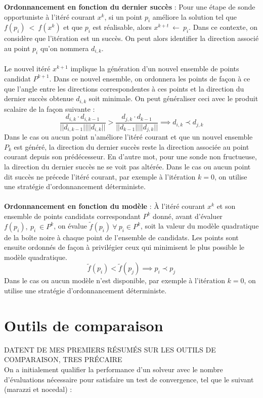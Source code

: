 \documentclass[letterpaper]{scrartcl}
\begin{document}
\indent \textbf{Ordonnancement en fonction du dernier succès} : Pour une étape de sonde opportuniste à l'itéré courant $x^k$, si un point $p_i$ améliore la solution tel que $f(p_i)\ <\ f(x^k)$ et que $p_i$ est réalisable, alors $x^{k+t}\ \leftarrow \ p_i$. Dans ce contexte, on considère que l'itération est un succès. On peut alors identifier la direction associé au point $p_i$ qu'on nommera $d_{i,k}$. \\\\
\indent Le nouvel itéré $x^{k+1}$ implique la génération d'un nouvel ensemble de points candidat $P^{k+1}$. Dans ce nouvel ensemble, on ordonnera les points de façon à ce que l'angle entre les directions correspondentes à ces points et la direction du dernier succès obtenue $d_{i,k}$ soit minimale. On peut généraliser ceci avec le produit scalaire de la façon suivante : 
\begin{equation}
\frac{d_{i,k}\cdot d_{i,k-1}}{||d_{i,k-1}||||{d_{i,k}||}} > \frac{d_{j,k}\cdot d_{k-1}}{||d_{k-1}||||{d_{j,k}||}}  \implies d_{i,k} \prec d_{j,k}  
\end{equation}
Dans le cas ou aucun point n'améliore l'itéré courant et que un nouvel ensemble $P_k$ est généré, la direction du dernier succès reste la direction associée au point courant depuis son prédécesseur. En d'autre mot, pour une sonde non fructueuse, la direction du dernier succès ne se voit pas altérée. Dans le cas ou aucun point dit succès ne précede l'itéré courant, par exemple à l'itération $k=0$, on utilise une stratégie d'ordonnancement déterministe.
\\\\
\textbf{Ordonnancement en fonction du modèle} : À l'itéré courant $x^k$ et son ensemble de points candidats correspondant $P^k$ donné, avant d'évaluer $f(p_i), \ p_i \ \in P^k$, on évalue $\tilde{f}(p_i) \ \forall \ p_i \in P^k$, soit la valeur du modèle quadratique de la boîte noire à chaque point de l'ensemble de candidats. Les points sont ensuite ordonnés de façon à privilégier ceux qui minimisent le plus possible le modèle quadratique. 
\begin{equation}
\tilde{f}(p_i) < \tilde{f}(p_j) \implies p_i \prec p_j
\end{equation}
Dans le cas ou aucun modèle n'est disponible, par exemple à l'itération $k=0$, on utilise une stratégie d'ordonnancement déterministe.
\section{Outils de comparaison}
DATENT DE MES PREMIERS RÉSUMÉS SUR LES OUTILS DE COMPARAISON, TRES PRÉCAIRE\\
On a initialement qualifier la performance d'un solveur avec le nombre d'évaluations nécessaire pour satisfaire un test de convergence, tel que le suivant (marazzi et nocedal) : 
\end{document}
